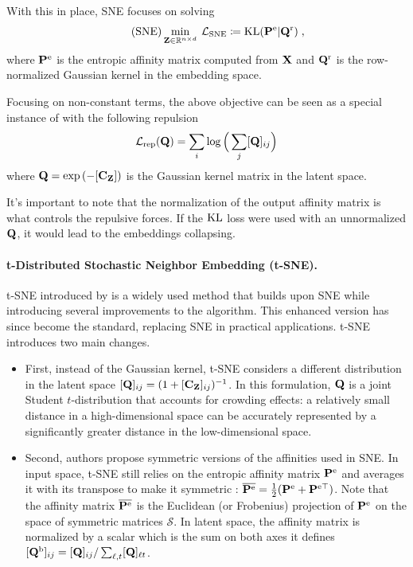With this in place, SNE focuses on solving
\begin{align}\label{eq:SNE_pb}\tag{SNE}
    \min_{{\mathbf{Z}} \in \mathbb{R}^{n \times d}} \: \mathcal{L}_{\mathrm{SNE}} \coloneqq \operatorname{KL}({\mathbf{P}}^{\mathrm{e}} | {\mathbf{Q}}^{\mathrm{r}}) \;,
\end{align}
where ${\mathbf{P}}^{\mathrm{e}}$ is the entropic affinity matrix computed from ${\mathbf{X}}$ and ${\mathbf{Q}}^{\mathrm{r}}$ is the row-normalized Gaussian kernel in the embedding space.

Focusing on non-constant terms, the above objective can be seen as a special instance of  with the following repulsion
\begin{align}
    \mathcal{L}_{\mathrm{rep}}({\mathbf{Q}}) = \sum_{i} \log \Big(\sum_j [{\mathbf{Q}}]_{ij} \Big)
\end{align}
where ${\mathbf{Q}} = \exp{(-[{\mathbf{C}}_{{\mathbf{Z}}}])}$ is the Gaussian kernel matrix in the latent space.

\begin{remark}\label{rem:norm_as_repulsion}
    It's important to note that the normalization of the output affinity matrix is what controls the repulsive forces. If the $\operatorname{KL}$ loss were used with an unnormalized ${\mathbf{Q}}$, it would lead to the embeddings collapsing.
\end{remark}

\paragraph{t-Distributed Stochastic Neighbor Embedding (t-SNE).} t-SNE introduced by \citet{van2008visualizing} is a widely used method that builds upon SNE while introducing several improvements to the algorithm. This enhanced version has since become the standard, replacing SNE in practical applications. t-SNE introduces two main changes. 
\begin{itemize}
    \item First, instead of the Gaussian kernel, t-SNE considers a different distribution in the latent space $[{\mathbf{Q}}]_{ij} = (1 + [\mathbf{C}_{\mathbf{Z}}]_{ij})^{-1}$. In this formulation, ${\mathbf{Q}}$ is a joint Student $t$-distribution that accounts for crowding effects: a relatively small
    distance in a high-dimensional space can be accurately represented by a
    significantly greater distance in the low-dimensional space. 
    \item Second, authors propose symmetric versions of the affinities used in SNE. In input space, t-SNE still relies on the entropic affinity matrix ${\mathbf{P}}^{\mathrm{e}}$ and averages it with its transpose to make it symmetric : $\overline{{\mathbf{P}}^{\mathrm{e}}} = \frac{1}{2}({\mathbf{P}}^{\mathrm{e}} + {\mathbf{P}}^{\mathrm{e} \top})$. Note that the affinity matrix $\overline{{\mathbf{P}}^{\mathrm{e}}}$ is the Euclidean (or Frobenius) projection of ${\mathbf{P}}^{\mathrm{e}}$ on the space of symmetric matrices $\mathcal{S}$. In latent space, the affinity matrix is normalized by a scalar which is the sum on both axes \ie it defines $[{\mathbf{Q}}^{\mathrm{b}}]_{ij} = [{\mathbf{Q}}]_{ij} /\sum_{\ell,t}[{\mathbf{Q}}]_{\ell t}$.
\end{itemize}

